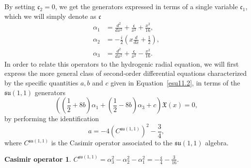 \documentclass[12pt,a4paper]{report}
\theoremstyle{definition}
\newtheorem*{casimir}{Casimir operator}
\theoremstyle{remark}
\theoremstyle{remark}
\begin{document}
By setting $\mathfrak{c}_2=0$, we get the generators expressed in terms of a single variable $\mathfrak{c}_1$, which we will simply denote as $\mathfrak{c}$
\begin{align*}
\alpha_1&=\frac{d^2}{dx^2}+\frac{\mathfrak{c}}{x^2}+\frac{x^2}{16}, \\
\alpha_2&=-\frac{i}{2}\left(x\frac{d}{dx}+\frac{1}{2}\right),\\
\alpha_3&=\frac{d^2}{dx^2}+\frac{\mathfrak{c}}{x^2}-\frac{x^2}{16}.
\end{align*} \indent
In order to relate this operators to the hydrogenic radial equation, we will first express the more general class of second-order differential equations characterized by the specific quantities $a,b$ and $c$ given in Equation~\ref{esu11.2}, in terms of the $\mathfrak{su}(1,1)$ generators
\begin{equation}\label{esu11.3}
\left(\left(\frac{1}{2}+8b\right)\alpha_1+\left(\frac{1}{2}-8b\right)\alpha_3+c\right)\mathfrak{X}(x)=0,
\end{equation}
by performing the identification
\begin{equation}\label{esu11.4}
a=-4(C^{\mathfrak{su}(1,1)})^2-\frac{3}{4},
\end{equation}
where $C^{\mathfrak{su}(1,1)}$ is the Casimir operator associated to the $\mathfrak{su}(1,1)$ algebra.
\begin{casimir}\label{su1.1casimir} $C^{\mathfrak{su}(1,1)}=\alpha_3^2-\alpha_2^2-\alpha_1^2=-\frac{\mathfrak{c}}{4}-\frac{3}{16}$.
\end{casimir}
\end{document}
